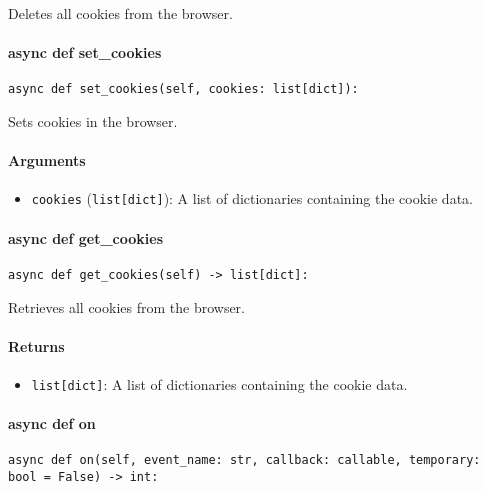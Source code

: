 \documentclass{article}
\begin{document}
\noindent Deletes all cookies from the browser.

\paragraph{async def set\_cookies}

\begin{lstlisting}[style=pythonstyle]
async def set_cookies(self, cookies: list[dict]):
\end{lstlisting}

\noindent Sets cookies in the browser.

\paragraph{Arguments}

\begin{itemize}
    \item \lstinline[style=pythonstyle]|cookies| (\lstinline[style=pythonstyle]|list[dict]|): A list of dictionaries containing the cookie data.
\end{itemize}

\paragraph{async def get\_cookies}

\begin{lstlisting}[style=pythonstyle]
async def get_cookies(self) -> list[dict]:
\end{lstlisting}

\noindent Retrieves all cookies from the browser.

\paragraph{Returns}

\begin{itemize}
    \item \lstinline[style=pythonstyle]|list[dict]|: A list of dictionaries containing the cookie data.
\end{itemize}

\paragraph{async def on}

\begin{lstlisting}[style=pythonstyle]
async def on(self, event_name: str, callback: callable, temporary: bool = False) -> int:
\end{lstlisting}
\end{document}
